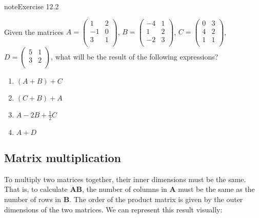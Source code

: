\documentclass[letterpaper,10pt,english]{jupyterBook}
\begin{document}
\begin{sphinxadmonition}{note}{Exercise 12.2}



\sphinxAtStartPar
Given the matrices \(A=\left(\begin{array}{cc}1 & 2 \\-1 & 0 \\3 & 1 \\\end{array}\right)\), \(B=\left(\begin{array}{cc}-4 & 1 \\1 & 2 \\-2 & 3 \\\end{array}\right)\), \(C=\left(\begin{array}{cc}0 & 3 \\4 & 2 \\1 & 1 \\\end{array}\right)\), \(D=\left(\begin{array}{cc}5 & 1 \\3 & 2 \\\end{array}\right)\), what will be the result of the following expressions?
\begin{enumerate}
%
\item {} 
\sphinxAtStartPar
\(\left(A+B\right)+C\)

\item {} 
\sphinxAtStartPar
\((C+B)+A\)

\item {} 
\sphinxAtStartPar
\(A-2B+\frac{1}{2}C\)

\item {} 
\sphinxAtStartPar
\(A+D\)

\end{enumerate}
\end{sphinxadmonition}


\subsection{Matrix multiplication}
\label{\detokenize{LinearAlgebra/linear_systems_matrices/matrices:matrix-multiplication}}
\sphinxAtStartPar
To multiply two matrices together, their inner dimensions must be the same. That is, to calculate \( \boldsymbol{A}\boldsymbol{B} \), the number of columns in \(\boldsymbol{A}\) must be the same as the number of rows in \(\boldsymbol{B}\). The order of the product matrix is given by the outer dimensions of the two matrices. We can represent this result visually:
\end{document}

